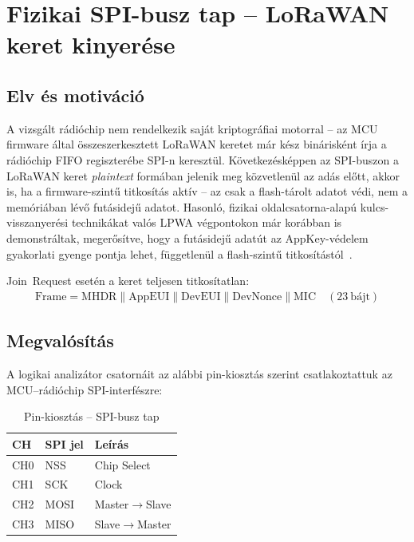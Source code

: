 \documentclass[12pt,a4paper]{article}
\begin{document}
\section{Fizikai SPI-busz tap -- LoRaWAN keret kinyerése}

\subsection{Elv és motiváció}

A vizsgált rádióchip nem rendelkezik saját kriptográfiai motorral -- az MCU
firmware által összeszerkesztett LoRaWAN keretet már kész binárisként írja
a rádióchip FIFO regiszterébe SPI-n keresztül.
Következésképpen az SPI-buszon a LoRaWAN keret \emph{plaintext} formában
jelenik meg közvetlenül az adás előtt, akkor is, ha a firmware-szintű titkosítás
aktív -- az csak a flash-tárolt adatot védi, nem a memóriában lévő futásidejű
adatot. Hasonló, fizikai oldalcsatorna-alapú kulcs-visszanyerési technikákat
valós LPWA végpontokon már korábban is demonstráltak, megerősítve, hogy a
futásidejű adatút az AppKey-védelem gyakorlati gyenge pontja lehet,
függetlenül a flash-szintű titkosítástól~\cite{Fukushima2019, Fukushima2020}.

Join~Request esetén a keret teljesen titkosítatlan:
\begin{align}
    \text{Frame} = \text{MHDR} \mathbin\| \text{AppEUI} \mathbin\|
    \text{DevEUI} \mathbin\| \text{DevNonce} \mathbin\| \text{MIC}
    \quad (23\ \text{bájt})
\end{align}

\subsection{Megvalósítás}

A logikai analizátor csatornáit az alábbi pin-kiosztás szerint
csatlakoztattuk az MCU--rádióchip SPI-interfészre:

\begin{table}[H]
\centering
\caption{Pin-kiosztás -- SPI-busz tap}
\begin{tabular}{lll}
\toprule
CH & SPI jel & Leírás \\
\midrule
CH0 & NSS  & Chip Select \\
CH1 & SCK  & Clock \\
CH2 & MOSI & Master$\to$Slave \\
CH3 & MISO & Slave$\to$Master \\
\bottomrule
\end{tabular}
\end{table}
\end{document}
